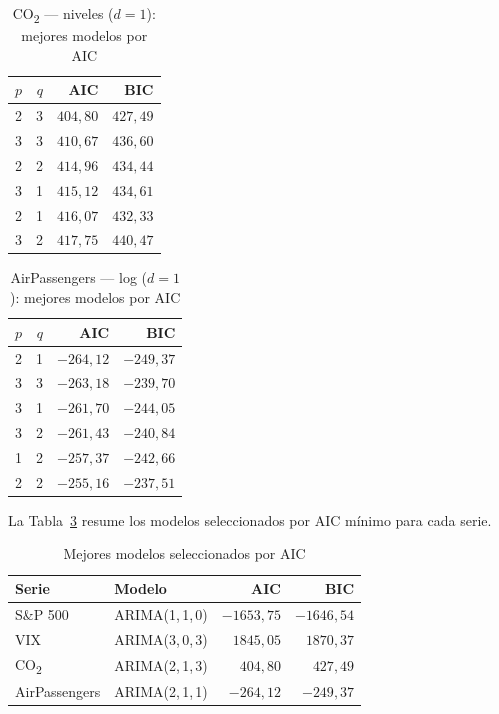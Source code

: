 \documentclass[12pt, a4paper]{article}
\begin{document}
\begin{table}[H]
    \centering
    \caption{CO\textsubscript{2} — niveles ($d=1$): mejores modelos por AIC}
    \label{tab:aic_co2}
    \begin{tabular}{rrrr}
        \toprule
        $p$ & $q$ & AIC & BIC \\
        \midrule
        2 & 3 & $404{,}80$ & $427{,}49$ \\
        3 & 3 & $410{,}67$ & $436{,}60$ \\
        2 & 2 & $414{,}96$ & $434{,}44$ \\
        3 & 1 & $415{,}12$ & $434{,}61$ \\
        2 & 1 & $416{,}07$ & $432{,}33$ \\
        3 & 2 & $417{,}75$ & $440{,}47$ \\
        \bottomrule
    \end{tabular}
\end{table}

\begin{table}[H]
    \centering
    \caption{AirPassengers — log ($d=1$): mejores modelos por AIC}
    \label{tab:aic_air}
    \begin{tabular}{rrrr}
        \toprule
        $p$ & $q$ & AIC & BIC \\
        \midrule
        2 & 1 & $-264{,}12$ & $-249{,}37$ \\
        3 & 3 & $-263{,}18$ & $-239{,}70$ \\
        3 & 1 & $-261{,}70$ & $-244{,}05$ \\
        3 & 2 & $-261{,}43$ & $-240{,}84$ \\
        1 & 2 & $-257{,}37$ & $-242{,}66$ \\
        2 & 2 & $-255{,}16$ & $-237{,}51$ \\
        \bottomrule
    \end{tabular}
\end{table}

La Tabla~\ref{tab:mejores_modelos} resume los modelos seleccionados por AIC mínimo para cada serie.

\begin{table}[H]
    \centering
    \caption{Mejores modelos seleccionados por AIC}
    \label{tab:mejores_modelos}
    \begin{tabular}{llrr}
        \toprule
        \textbf{Serie} & \textbf{Modelo} & \textbf{AIC} & \textbf{BIC} \\
        \midrule
        S\&P 500      & ARIMA(1,\,1,\,0) & $-1653{,}75$ & $-1646{,}54$ \\
        VIX           & ARIMA(3,\,0,\,3) & $1845{,}05$  & $1870{,}37$  \\
        CO\textsubscript{2} & ARIMA(2,\,1,\,3) & $404{,}80$ & $427{,}49$ \\
        AirPassengers & ARIMA(2,\,1,\,1) & $-264{,}12$  & $-249{,}37$  \\
        \bottomrule
    \end{tabular}
\end{table}
\end{document}
